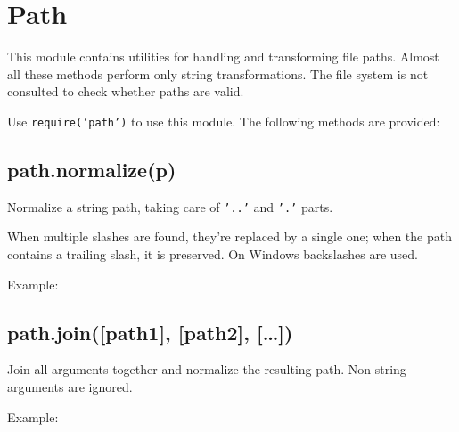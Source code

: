 \section{Path}

\begin{Shaded}
\begin{Highlighting}[]
\NormalTok{: } 
\end{Highlighting}
\end{Shaded}

This module contains utilities for handling and transforming file paths.
Almost all these methods perform only string transformations. The file
system is not consulted to check whether paths are valid.

Use \texttt{require('path')} to use this module. The following methods
are provided:

\subsection{path.normalize(p)}

Normalize a string path, taking care of \texttt{'..'} and \texttt{'.'}
parts.

When multiple slashes are found, they're replaced by a single one; when
the path contains a trailing slash, it is preserved. On Windows
backslashes are used.

Example:

\begin{Shaded}
\begin{Highlighting}[]
\NormalTok{(}\NormalTok{)}
\end{Highlighting}
\end{Shaded}

\subsection{path.join({[}path1{]}, {[}path2{]}, {[}\ldots{}{]})}

Join all arguments together and normalize the resulting path. Non-string
arguments are ignored.

Example:

\begin{Shaded}
\begin{Highlighting}[]
\NormalTok{(}\NormalTok{, }\NormalTok{, }\NormalTok{, }\NormalTok{, }\NormalTok{)}

\NormalTok{(}\NormalTok{, \{\}, }\NormalTok{)}
\end{Highlighting}
\end{Shaded}

